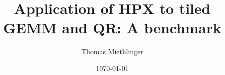 
\title{Application of HPX to tiled GEMM and QR: A benchmark}

\author{Thomas Miethlinger}
\date{\today}

\maketitle
